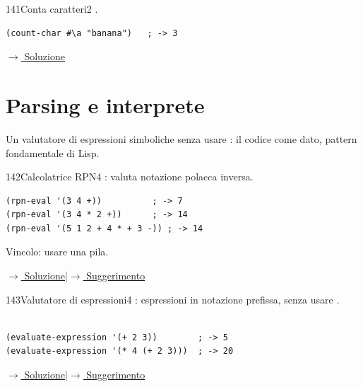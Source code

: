 \label{ex:141}
\begin{colbox}{141}{Conta caratteri}{2}
 .
\nopagebreak
\begin{lstlisting}
(count-char #\a "banana")   ; -> 3
\end{lstlisting}


\small\color{black!55}\hyperref[sol:141]{$\rightarrow$ Soluzione}\normalsize\color{black}
\end{colbox}

\setcounter{section}{8}
\section{Parsing e interprete}

\noindent
Un valutatore di espressioni simboliche senza usare :
il codice come dato, pattern fondamentale di Lisp.

\bigskip

\label{ex:142}
\begin{stdbox}{142}{Calcolatrice RPN}{4}
 : valuta notazione
polacca inversa.
\begin{lstlisting}
(rpn-eval '(3 4 +))          ; -> 7
(rpn-eval '(3 4 * 2 +))      ; -> 14
(rpn-eval '(5 1 2 + 4 * + 3 -)) ; -> 14
\end{lstlisting}
Vincolo: usare una pila.



\small\color{black!55}\hyperref[sol:142]{$\rightarrow$ Soluzione}\enspace\textcolor{black!30}{|}\enspace\hyperref[hint:142]{$\rightarrow$ Suggerimento}\normalsize\color{black}
\end{stdbox}

\label{ex:143}
\begin{stdbox}{143}{Valutatore di espressioni}{4}
 : espressioni
in notazione prefissa, senza usare .\\\\
\begin{lstlisting}
(evaluate-expression '(+ 2 3))        ; -> 5
(evaluate-expression '(* 4 (+ 2 3)))  ; -> 20
\end{lstlisting}

\small\color{black!55}\hyperref[sol:143]{$\rightarrow$ Soluzione}\enspace\textcolor{black!30}{|}\enspace\hyperref[hint:143]{$\rightarrow$ Suggerimento}\normalsize\color{black}
\end{stdbox}

